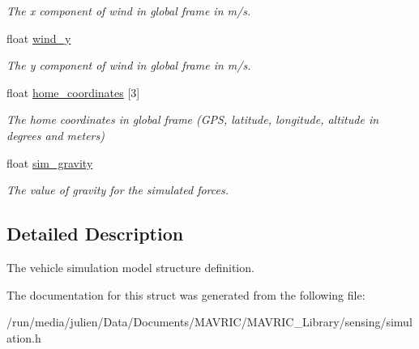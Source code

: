 \begin{DoxyCompactItemize}
\begin{DoxyCompactList}\small\item\em The x component of wind in global frame in m/s. \end{DoxyCompactList}\item 
\hypertarget{structsimulation__config__t_a4b8c1987d11c6e2f1988d16e020cd728}{float \hyperlink{structsimulation__config__t_a4b8c1987d11c6e2f1988d16e020cd728}{wind\+\_\+y}}\label{structsimulation__config__t_a4b8c1987d11c6e2f1988d16e020cd728}

\begin{DoxyCompactList}\small\item\em The y component of wind in global frame in m/s. \end{DoxyCompactList}\item 
\hypertarget{structsimulation__config__t_a58f77298c921579ec55585f6cd51da2e}{float \hyperlink{structsimulation__config__t_a58f77298c921579ec55585f6cd51da2e}{home\+\_\+coordinates} \mbox{[}3\mbox{]}}\label{structsimulation__config__t_a58f77298c921579ec55585f6cd51da2e}

\begin{DoxyCompactList}\small\item\em The home coordinates in global frame (G\+P\+S, latitude, longitude, altitude in degrees and meters) \end{DoxyCompactList}\item 
\hypertarget{structsimulation__config__t_a88fab754ca4266e8745790dd39c82ba9}{float \hyperlink{structsimulation__config__t_a88fab754ca4266e8745790dd39c82ba9}{sim\+\_\+gravity}}\label{structsimulation__config__t_a88fab754ca4266e8745790dd39c82ba9}

\begin{DoxyCompactList}\small\item\em The value of gravity for the simulated forces. \end{DoxyCompactList}\end{DoxyCompactItemize}


\subsection{Detailed Description}
The vehicle simulation model structure definition. 

The documentation for this struct was generated from the following file\+:\begin{DoxyCompactItemize}
\item 
/run/media/julien/\+Data/\+Documents/\+M\+A\+V\+R\+I\+C/\+M\+A\+V\+R\+I\+C\+\_\+\+Library/sensing/simulation.\+h\end{DoxyCompactItemize}
